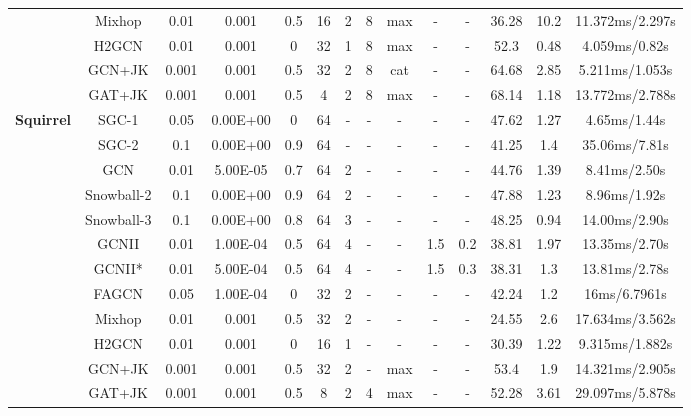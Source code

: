 \documentclass{article}
\newcommand{\0}{{\boldsymbol{0}}}
\newcommand{\6}{{\partial}}
\newcommand{\8}{{\infty}}
\newcommand{\4}{{\nabla}}
\begin{document}
\begin{table}[htbp]
{\begin{tabular}{c|c|cccccccccccc}
          &  Mixhop & 0.01  & 0.001 & 0.5   & 16    & 2     & 8     & {max} & - & - & 36.28 & 10.2  & {11.372ms/2.297s} \\
          & H2GCN & 0.01  & 0.001 & 0     & 32    & 1     & 8     & {max} & - & - & 52.3  & 0.48  & {4.059ms/0.82s} \\
          & GCN+JK & 0.001 & 0.001 & 0.5   & 32    & 2     & 8     & {cat} & - & - & 64.68 & 2.85  & {5.211ms/1.053s} \\
          &  GAT+JK & 0.001 & 0.001 & 0.5   & 4     & 2     & 8     & {max} & - & - & 68.14 & 1.18  & {13.772ms/2.788s} \\
          \midrule
    \multirow{12}[0]{*}{\textbf{Squirrel}} & SGC-1 & 0.05  & 0.00E+00 & 0     & 64    & -     & -     & -     & -     & -     & 47.62 & 1.27  & 4.65ms/1.44s \\
          & SGC-2 & 0.1   & 0.00E+00 & 0.9   & 64    & -     & -     & -     & -     & -     & 41.25 & 1.4   & 35.06ms/7.81s \\
          & GCN   & 0.01  & 5.00E-05 & 0.7   & 64    & 2     & -     & -     & -     & -     & 44.76 & 1.39  & 8.41ms/2.50s \\
          & Snowball-2 & 0.1   & 0.00E+00 & 0.9   & 64    & 2     & -     & -     & -     & -     & 47.88 & 1.23  & 8.96ms/1.92s \\
          & Snowball-3 & 0.1   & 0.00E+00 & 0.8   & 64    & 3     & -     & -     & -     & -     & 48.25 & 0.94  & 14.00ms/2.90s \\
          & GCNII & 0.01  & 1.00E-04 & 0.5   & 64    & 4     & -     & -     & 1.5   & 0.2   & 38.81 & 1.97  & 13.35ms/2.70s \\
          & GCNII* & 0.01  & 5.00E-04 & 0.5   & 64    & 4     & -     & -     & 1.5   & 0.3   & 38.31 & 1.3   & 13.81ms/2.78s \\
          & FAGCN & 0.05  & 1.00E-04 & 0     & 32    & 2     & -     & -     & -     & -     & 42.24 & 1.2   & 16ms/6.7961s \\
          &  Mixhop & 0.01  & 0.001 & 0.5   & 32    & 2     & - & - & - & - & 24.55 & 2.6   & {17.634ms/3.562s} \\
          & H2GCN & 0.01  & 0.001 & 0     & 16    & 1     & - & - & - & - & 30.39 & 1.22  & {9.315ms/1.882s} \\
          & GCN+JK & 0.001 & 0.001 & 0.5   & 32    & 2     & - & {max} & - & - & 53.4  & 1.9   & {14.321ms/2.905s} \\
          &  GAT+JK & 0.001 & 0.001 & 0.5   & 8     & 2     & 4     & {max} & - & - & 52.28 & 3.61  & {29.097ms/5.878s} \\

\end{tabular}}
\end{table}
\end{document}
